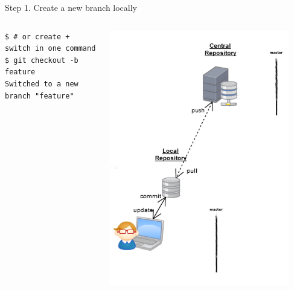 \begin{frame}[fragile]{Step 1. Create a new branch locally}
\begin{columns}
\begin{column}{0.6\textwidth}
\begin{lstlisting}
$ # or create + switch in one command
$ git checkout -b feature 
Switched to a new branch "feature"
  	\end{lstlisting}
  	\end{column}
	\begin{column}{0.4\textwidth}
		\begin{center}
			 {
				\includegraphics[width=0.9\textwidth]{branch_a.png}
			} \only<2-> {
}
\end{center}
\end{column}
\end{columns}
\end{frame}
